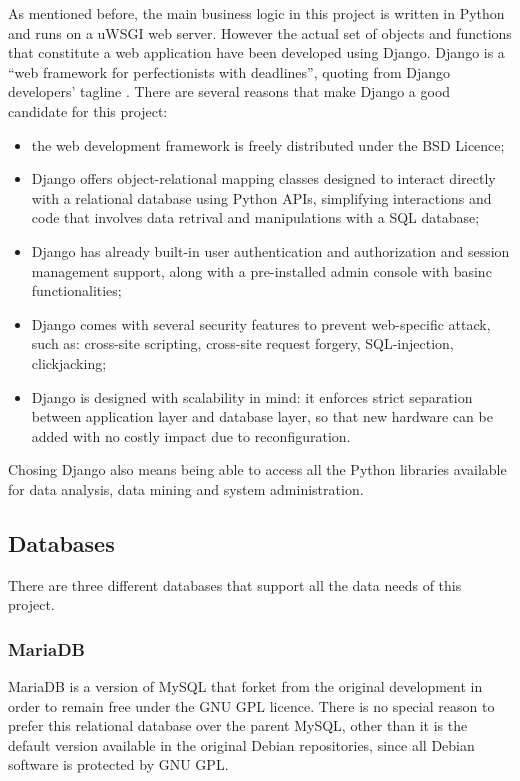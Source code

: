 As mentioned before, the main business logic in this project is written in
Python and runs on a uWSGI web server. However the actual set of objects and
functions that constitute a web application have been developed using Django.
Django is a ``web framework for perfectionists with deadlines'', quoting from
Django developers' tagline \cite{Django}. There are several reasons that make
Django a good candidate for this project:
\begin{itemize}
  \item the web development framework is freely distributed under the BSD
  Licence;
  \item Django offers object-relational mapping classes designed to interact
  directly with a relational database using Python APIs, simplifying
  interactions and code that involves data retrival and manipulations with a SQL
  database;
  \item Django has already built-in user authentication and authorization and session management
  support, along with a pre-installed admin console with basinc
  functionalities;
  \item Django comes with several security features to prevent web-specific
  attack, such as: cross-site scripting, cross-site request forgery,
  SQL-injection, clickjacking;
  \item Django is designed with scalability in mind: it enforces strict
  separation between application layer and database layer, so that new hardware
  can be added with no costly impact due to reconfiguration.
\end{itemize}

Chosing Django also means being able to access all the Python libraries
available for data analysis, data mining and system administration.

\subsection{Databases}
There are three different databases that support all the data needs of this
project.

\subsubsection{MariaDB}
MariaDB is a version of MySQL that forket from the original development in order
to remain free under the GNU GPL licence. There is no special reason to prefer
this relational database over the parent MySQL, other than it is the default
version available in the original Debian repositories, since all Debian software
is protected by GNU GPL.

